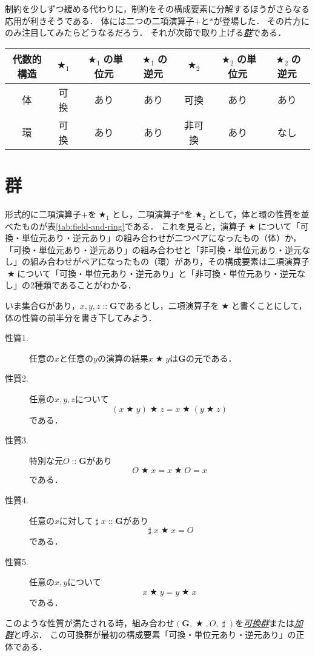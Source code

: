 \documentclass[twocolumn]{jsbook}
\newcommand{\keyword}[1]{\underline{\emph{#1}}}
\DeclareMathOperator{\mathAnyBinaryOperator}{\bigstar}
\DeclareMathOperator{\mathInverse}{\sharp}
\DeclareMathOperator{\mathIn}{::}
\newcommand{\mathSet}[1]{\mathbf{#1}}
\newcommand{\mathGroup}[4]{(#1,#2,#3,#4)}
\begin{document}
制約を少しずつ緩める代わりに，制約をその構成要素に分解するほうがさらなる応用が利きそうである．
体には二つの二項演算子$+$と$*$が登場した．
その片方にのみ注目してみたらどうなるだろう．
それが次節で取り上げる\keyword{群}である．

\begin{table*}
\caption{代表的な代数的構造の性質(1)}
\label{tab:field-and-ring}
\begin{center}
\begin{tabular}{||c||c|c|c|c|c|c||}
\hline
代数的構造&$\mathAnyBinaryOperator_1$&$\mathAnyBinaryOperator_1$の単位元&$\mathAnyBinaryOperator_1$の逆元&$\mathAnyBinaryOperator_2$&$\mathAnyBinaryOperator_2$の単位元&$\mathAnyBinaryOperator_2$の逆元\\
\hline\hline
体&可換&あり&あり&可換&あり&あり\\
環&可換&あり&あり&非可換&あり&なし\\
\hline
\end{tabular}
\end{center}
\end{table*}

\section{群}

形式的に二項演算子$+$を$\mathAnyBinaryOperator_1$とし，二項演算子$*$を$\mathAnyBinaryOperator_2$として，体と環の性質を並べたものが表\ref{tab:field-and-ring}である．
これを見ると，演算子$\mathAnyBinaryOperator$について「可換・単位元あり・逆元あり」の組み合わせが二つペアになったもの（体）か，「可換・単位元あり・逆元あり」の組み合わせと「非可換・単位元あり・逆元なし」の組み合わせがペアになったもの（環）があり，その構成要素は二項演算子$\mathAnyBinaryOperator$について「可換・単位元あり・逆元あり」と「非可換・単位元あり・逆元なし」の2種類であることがわかる．

いま集合$\mathSet{G}$があり，$x,y,z\mathIn\mathSet{G}$であるとし，二項演算子を$\mathAnyBinaryOperator$と書くことにして，体の性質の前半分を書き下してみよう．
\begin{description}
\item[性質1.] 任意の$x$と任意の$y$の演算の結果$x\mathAnyBinaryOperator y$は$\mathSet{G}$の元である．
\item[性質2.] 任意の$x,y,z$について$$(x\mathAnyBinaryOperator y)\mathAnyBinaryOperator z=x\mathAnyBinaryOperator(y\mathAnyBinaryOperator z)$$である．
\item[性質3.] 特別な元$O\mathIn\mathSet{G}$があり$$O\mathAnyBinaryOperator x=x\mathAnyBinaryOperator O=x$$である．
\item[性質4.] 任意の$x$に対して$\mathInverse x\mathIn\mathSet{G}$があり$$\mathInverse x\mathAnyBinaryOperator x=O$$である．
\item[性質5.] 任意の$x,y$について$$x\mathAnyBinaryOperator y=y\mathAnyBinaryOperator x$$である．
\end{description}
このような性質が満たされる時，組み合わせ$\mathGroup{\mathSet{G}}{\mathAnyBinaryOperator}{O}{\mathInverse}$を\keyword{可換群}または\keyword{加群}と呼ぶ．
この可換群が最初の構成要素「可換・単位元あり・逆元あり」の正体である．
\end{document}

